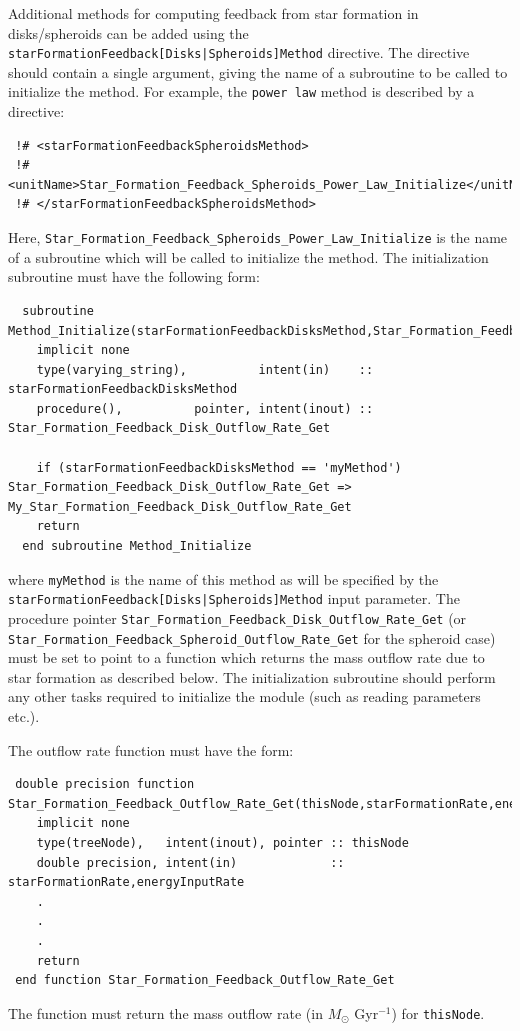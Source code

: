 Additional methods for computing feedback from star formation in disks/spheroids can be added using the {\tt starFormationFeedback[Disks|Spheroids]Method} directive. The directive should contain a single argument, giving the name of a subroutine to be called to initialize the method. For example, the {\tt power law} method is described by a directive:
\begin{verbatim}
 !# <starFormationFeedbackSpheroidsMethod>
 !#  <unitName>Star_Formation_Feedback_Spheroids_Power_Law_Initialize</unitName>
 !# </starFormationFeedbackSpheroidsMethod>
\end{verbatim}
Here, {\tt Star\_Formation\_Feedback\_Spheroids\_Power\_Law\_Initialize} is the name of a subroutine which will be called to initialize the method. The initialization subroutine must have the following form:
\begin{verbatim}
  subroutine Method_Initialize(starFormationFeedbackDisksMethod,Star_Formation_Feedback_Disk_Outflow_Rate_Get)
    implicit none
    type(varying_string),          intent(in)    :: starFormationFeedbackDisksMethod
    procedure(),          pointer, intent(inout) :: Star_Formation_Feedback_Disk_Outflow_Rate_Get
    
    if (starFormationFeedbackDisksMethod == 'myMethod') Star_Formation_Feedback_Disk_Outflow_Rate_Get => My_Star_Formation_Feedback_Disk_Outflow_Rate_Get
    return
  end subroutine Method_Initialize
\end{verbatim}
where {\tt myMethod} is the name of this method as will be specified by the {\tt starFormationFeedback[Disks|Spheroids]Method} input parameter. The procedure pointer {\tt Star\_Formation\_Feedback\_Disk\_Outflow\_Rate\_Get} (or {\tt Star\_Formation\_Feedback\_Spheroid\_Outflow\_Rate\_Get} for the spheroid case) must be set to point to a function which returns the mass outflow rate due to star formation as described below. The initialization subroutine should perform any other tasks required to initialize the module (such as reading parameters etc.).

The outflow rate function must have the form:
\begin{verbatim}
 double precision function Star_Formation_Feedback_Outflow_Rate_Get(thisNode,starFormationRate,energyInputRate)
    implicit none
    type(treeNode),   intent(inout), pointer :: thisNode
    double precision, intent(in)             :: starFormationRate,energyInputRate
    .
    .
    .
    return
 end function Star_Formation_Feedback_Outflow_Rate_Get
\end{verbatim}
The function must return the mass outflow rate (in $M_\odot$ Gyr$^{-1}$) for {\tt thisNode}.

